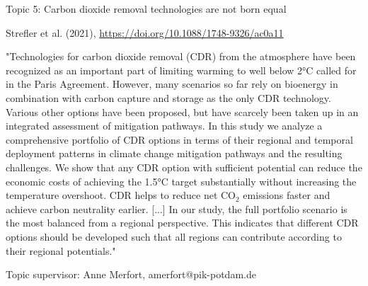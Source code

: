 \documentclass[10pt,aspectratio=169,dvipsnames]{beamer}
\begin{document}
\begin{frame}
  \begin{block}{Topic 5:  Carbon dioxide removal technologies are not born equal}
      
    Strefler et al. (2021), 
    \href{https://doi.org/10.1088/1748-9326/ac0a11}{https://doi.org/10.1088/1748-9326/ac0a11}
    
    "Technologies for carbon dioxide removal (CDR) from the atmosphere have been recognized as an important part of limiting warming to well below 2°C called for in the Paris Agreement. However, many scenarios so far rely on bioenergy in combination with carbon capture and storage as the only CDR technology. Various other options have been proposed, but have scarcely been taken up in an integrated assessment of mitigation pathways. In this study we analyze a comprehensive portfolio of CDR options in terms of their regional and temporal deployment patterns in climate change mitigation pathways and the resulting challenges. We show that any CDR option with sufficient potential can reduce the economic costs of achieving the 1.5°C target substantially without increasing the temperature overshoot. CDR helps to reduce net CO$_2$ emissions faster and achieve carbon neutrality earlier. [...] In our study, the full portfolio scenario is the most balanced from a regional perspective. This indicates that different CDR options should be developed such that all regions can contribute according to their regional potentials."

    \hfill
    Topic supervisor:  Anne Merfort, amerfort@pik-potdam.de
    
  \end{block}
\end{frame}
\end{document}
